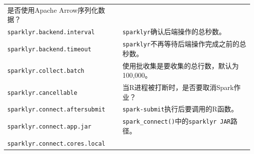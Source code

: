 \documentclass[
]{article}
\begin{document}
\begin{longtable}[]{@{}ll@{}}
\begin{minipage}[t]{0.47\columnwidth}
是否使用Apache Arrow序列化数据？\strut
\end{minipage}\tabularnewline
\begin{minipage}[t]{0.47\columnwidth}\raggedright
\texttt{sparklyr.backend.interval}\strut
\end{minipage} & \begin{minipage}[t]{0.47\columnwidth}\raggedright
\texttt{sparklyr}确认后端操作的总秒数。\strut
\end{minipage}\tabularnewline
\begin{minipage}[t]{0.47\columnwidth}\raggedright
\texttt{sparklyr.backend.timeout}\strut
\end{minipage} & \begin{minipage}[t]{0.47\columnwidth}\raggedright
\texttt{sparklyr}不再等待后端操作完成之前的总秒数。\strut
\end{minipage}\tabularnewline
\begin{minipage}[t]{0.47\columnwidth}\raggedright
\texttt{sparklyr.collect.batch}\strut
\end{minipage} & \begin{minipage}[t]{0.47\columnwidth}\raggedright
使用批收集是要收集的总行数，默认为100,000。\strut
\end{minipage}\tabularnewline
\begin{minipage}[t]{0.47\columnwidth}\raggedright
\texttt{sparklyr.cancellable}\strut
\end{minipage} & \begin{minipage}[t]{0.47\columnwidth}\raggedright
当R进程被打断时，是否要取消Spark作业？\strut
\end{minipage}\tabularnewline
\begin{minipage}[t]{0.47\columnwidth}\raggedright
\texttt{sparklyr.connect.aftersubmit}\strut
\end{minipage} & \begin{minipage}[t]{0.47\columnwidth}\raggedright
\texttt{spark-submit}执行后要调用的R函数。\strut
\end{minipage}\tabularnewline
\begin{minipage}[t]{0.47\columnwidth}\raggedright
\texttt{sparklyr.connect.app.jar}\strut
\end{minipage} & \begin{minipage}[t]{0.47\columnwidth}\raggedright
\texttt{spark\_connect()}中的\texttt{sparklyr\ JAR}路径。\strut
\end{minipage}\tabularnewline
\begin{minipage}[t]{0.47\columnwidth}\raggedright
\texttt{sparklyr.connect.cores.local}\strut

\end{minipage}
\end{longtable}
\end{document}

